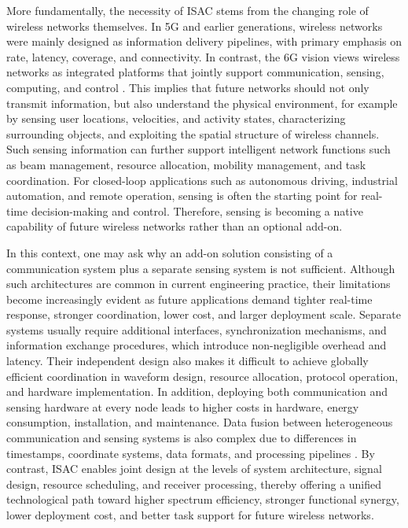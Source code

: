 More fundamentally, the necessity of ISAC stems from the changing role of wireless networks themselves. In 5G and earlier generations, wireless networks were mainly designed as information delivery pipelines, with primary emphasis on rate, latency, coverage, and connectivity. In contrast, the 6G vision views wireless networks as integrated platforms that jointly support communication, sensing, computing, and control \cite{Liu2022ISAC,Zhang2021ISAC6G}. This implies that future networks should not only transmit information, but also understand the physical environment, for example by sensing user locations, velocities, and activity states, characterizing surrounding objects, and exploiting the spatial structure of wireless channels. Such sensing information can further support intelligent network functions such as beam management, resource allocation, mobility management, and task coordination. For closed-loop applications such as autonomous driving, industrial automation, and remote operation, sensing is often the starting point for real-time decision-making and control. Therefore, sensing is becoming a native capability of future wireless networks rather than an optional add-on.

In this context, one may ask why an add-on solution consisting of a communication system plus a separate sensing system is not sufficient. Although such architectures are common in current engineering practice, their limitations become increasingly evident as future applications demand tighter real-time response, stronger coordination, lower cost, and larger deployment scale. Separate systems usually require additional interfaces, synchronization mechanisms, and information exchange procedures, which introduce non-negligible overhead and latency. Their independent design also makes it difficult to achieve globally efficient coordination in waveform design, resource allocation, protocol operation, and hardware implementation. In addition, deploying both communication and sensing hardware at every node leads to higher costs in hardware, energy consumption, installation, and maintenance. Data fusion between heterogeneous communication and sensing systems is also complex due to differences in timestamps, coordinate systems, data formats, and processing pipelines \cite{Liu2022ISAC,Hassanien2015dual}. By contrast, ISAC enables joint design at the levels of system architecture, signal design, resource scheduling, and receiver processing, thereby offering a unified technological path toward higher spectrum efficiency, stronger functional synergy, lower deployment cost, and better task support for future wireless networks.

